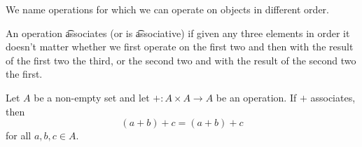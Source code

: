 

We name operations for which we can operate on objects in different order.



An operation \t{associates} (or is \t{associative}) if given any three elements in order it doesn't matter whether we first operate on the first two and then with the result of the first two the third, or the second two and with the result of the second two the first.


Let $A$ be a non-empty set and let $+: A \times A \to A$
be an operation.
If $+$ associates, then
\[
  (a + b) + c = (a + b) + c
\]
for all $a, b, c \in A$.

\blankpage
